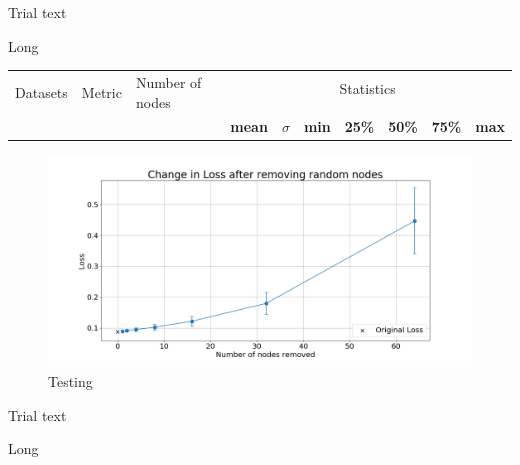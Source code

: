 \documentclass[UKenglish]{ifimaster}
\begin{document}
            Trial text

            \begin{table}[h!]
                \centering
                \resizebox{\textwidth}{!}{}
                \caption[Short]{Long}
                \label{tab:loss_rnd_rem_mnist}
            \end{table}

            \begin{table}
                \begin{tabular}{l|l|l|rrrrrrr}
                    \toprule
                    \multirow{2}{*}{Datasets} & \multirow{2}{*}{Metric} & \multirow{2}{*}{Number of nodes} & \multicolumn{7}{c}{Statistics}\\
                    \cmidrule{4-10}\\
                    {} & {} & {} & \textbf{mean} & \textbf{$\sigma$} & \textbf{min} & \textbf{25\%}
                    & \textbf{50\%} & \textbf{75\%} & \textbf{max} \\
                    \midrule
                    
                \end{tabular}
            \end{table}

            \begin{figure}[h!]\centering
                \includegraphics[width=\textwidth]{Loss_change_random_removal_mnist.png}
                \caption[Short title]{Testing}
                \label{fig:loss_rn_mnist}
            \end{figure}

            Trial text

            \begin{table}[h!]
                \centering
                \resizebox{\textwidth}{!}{}
                \caption[Short]{Long}
                \label{tab:nr_rnd_rem_imp_mnist}
            \end{table}
\end{document}
